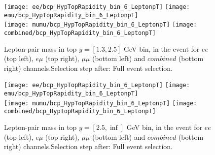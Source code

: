 \clearpage
\newpage
\begin{figure}
  \texttt{[image: ee/bcp\_HypTopRapidity\_bin\_6\_LeptonpT]}
  \texttt{[image: emu/bcp\_HypTopRapidity\_bin\_6\_LeptonpT]}\\
  \texttt{[image: mumu/bcp\_HypTopRapidity\_bin\_6\_LeptonpT]}
  \texttt{[image: combined/bcp\_HypTopRapidity\_bin\_6\_LeptonpT]}
\caption{Lepton-pair mass in top $y = [1.3,2.5]$ GeV bin, in the event for $ee$ (top left), $e\mu$ (top right), $\mu\mu$ (bottom left) and $combined$ (bottom right) channels.\newline Selection step after: Full event selection.}
\end{figure}

\clearpage
\newpage
\begin{figure}
  \texttt{[image: ee/bcp\_HypTopRapidity\_bin\_6\_LeptonpT]}
  \texttt{[image: emu/bcp\_HypTopRapidity\_bin\_6\_LeptonpT]}\\
  \texttt{[image: mumu/bcp\_HypTopRapidity\_bin\_6\_LeptonpT]}
  \texttt{[image: combined/bcp\_HypTopRapidity\_bin\_6\_LeptonpT]}
\caption{Lepton-pair mass in top $y = [2.5,\inf]$ GeV bin, in the event for $ee$ (top left), $e\mu$ (top right), $\mu\mu$ (bottom left) and $combined$ (bottom right) channels.\newline Selection step after: Full event selection.}
\end{figure}

\clearpage
\newpage





% 
% 


